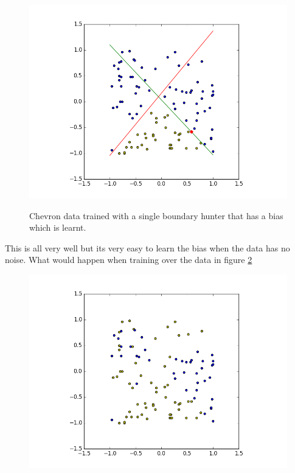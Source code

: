 \documentclass[notitlepage]{report}
\theoremstyle{definition}
\begin{document}
\begin{figure}[H]
  \centering
  \begin{minipage}[b]{0.8\textwidth}
    \includegraphics[width=\textwidth]{CHEVData-SingleBH-WithByas.png}
    \caption{}
    \label{fig:CHEVData-SingleBH-WithByas}
  \end{minipage}
  \hfill

Chevron data trained with a single boundary hunter that has a bias which is learnt.
\end{figure}

This is all very well but its very easy to learn the bias when the data has no noise. What would happen when training over the data in figure \ref{fig:noisychev-rawdata}

\begin{figure}[H]
  \centering
  \begin{minipage}[b]{0.8\textwidth}
    \includegraphics[width=\textwidth]{NoisyChev-RawData.png}
    \caption{}
    \label{fig:noisychev-rawdata}
  \end{minipage}
  \hfill
\end{figure}
\end{document}
